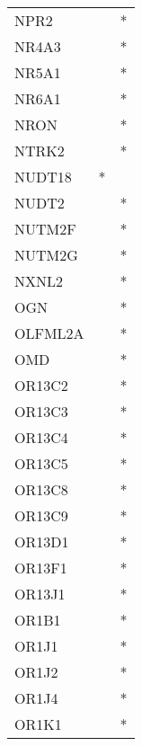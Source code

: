 \begin{longtable}{lcc}
NPR2                  &                &          * \\
NR4A3                 &                &          * \\
NR5A1                 &                &          * \\
NR6A1                 &                &          * \\
NRON                  &                &          * \\
NTRK2                 &                &          * \\
NUDT18                &              * &            \\
NUDT2                 &                &          * \\
NUTM2F                &                &          * \\
NUTM2G                &                &          * \\
NXNL2                 &                &          * \\
OGN                   &                &          * \\
OLFML2A               &                &          * \\
OMD                   &                &          * \\
OR13C2                &                &          * \\
OR13C3                &                &          * \\
OR13C4                &                &          * \\
OR13C5                &                &          * \\
OR13C8                &                &          * \\
OR13C9                &                &          * \\
OR13D1                &                &          * \\
OR13F1                &                &          * \\
OR13J1                &                &          * \\
OR1B1                 &                &          * \\
OR1J1                 &                &          * \\
OR1J2                 &                &          * \\
OR1J4                 &                &          * \\
OR1K1                 &                &          * \\

\end{longtable}
